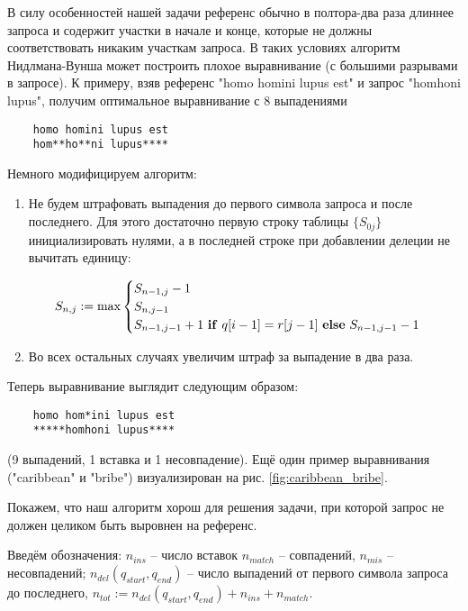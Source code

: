 \documentclass{main.tex}[subfiles]
\begin{document}
В силу особенностей нашей задачи референс обычно в полтора-два раза длиннее запроса и содержит участки в начале и конце, которые не должны соответствовать никаким участкам запроса.
В таких условиях алгоритм Нидлмана-Вунша может построить плохое выравнивание (с большими разрывами в запросе).
К примеру, взяв референс "homo homini lupus est"\hspace{0pt} и запрос "homhoni lupus"\hspace{0pt}, получим оптимальное выравнивание с 8 выпадениями

\begin{verbatim}
    homo homini lupus est
    hom**ho**ni lupus****
\end{verbatim}

Немного модифицируем алгоритм:

\begin{enumerate}[noitemsep]
    \item Не будем штрафовать выпадения до первого символа запроса и после последнего.
    Для этого достаточно первую строку таблицы $ \{ S_{0j} \} $ инициализировать нулями, а в последней строке при добавлении делеции не вычитать единицу:

    \[ S_{n,j} := \max \begin{cases}
        S_{n-1,j} - 1 \\
        S_{n,j-1} \\
        S_{n-1,j-1} + 1 \text{ \textbf{if} } q[i-1] = r[j-1] \text{ \textbf{else} } S_{n-1,j-1} - 1
    \end{cases} \]
    \item Во всех остальных случаях увеличим штраф за выпадение в два раза.
\end{enumerate}

Теперь выравнивание выглядит следующим образом:

\begin{verbatim}
    homo hom*ini lupus est
    *****homhoni lupus****
\end{verbatim}

(9 выпадений, 1 вставка и 1 несовпадение).
Ещё один пример выравнивания ("caribbean"\hspace{0pt} и "bribe") визуализирован на рис. \ref{fig:caribbean_bribe}.

Покажем, что наш алгоритм хорош для решения задачи, при которой запрос не должен целиком быть выровнен на референс.

Введём обозначения: $n_{ins}$ -- число вставок $n_{match}$ -- совпадений, $n_{mis}$ -- несовпадений;  $n_{del}(q_{start},q_{end})$ -- число выпадений от первого символа запроса до последнего, $n_{tot} := n_{del}(q_{start},q_{end}) + n_{ins} + n_{match}$.
\end{document}
